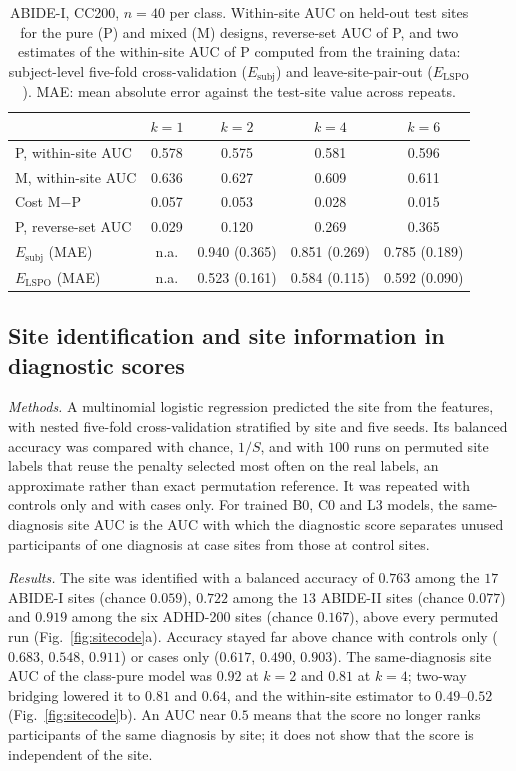 \begin{table}[h]
\centering
\caption{ABIDE-I, CC200, $n=40$ per class. Within-site AUC on held-out test sites for the pure (P) and mixed (M) designs, reverse-set AUC of P, and two estimates of the within-site AUC of P computed from the training data: subject-level five-fold cross-validation ($E_{\mathrm{subj}}$) and leave-site-pair-out ($E_{\mathrm{LSPO}}$). MAE: mean absolute error against the test-site value across repeats.}
\label{tab:kcurve}
\begin{tabular}{lcccc}
\toprule
& $k=1$ & $k=2$ & $k=4$ & $k=6$\\
\midrule
P, within-site AUC & 0.578 & 0.575 & 0.581 & 0.596\\
M, within-site AUC & 0.636 & 0.627 & 0.609 & 0.611\\
Cost M$-$P & 0.057 & 0.053 & 0.028 & 0.015\\
P, reverse-set AUC & 0.029 & 0.120 & 0.269 & 0.365\\
\midrule
$E_{\mathrm{subj}}$ (MAE) & n.a. & 0.940 (0.365) & 0.851 (0.269) & 0.785 (0.189)\\
$E_{\mathrm{LSPO}}$ (MAE) & n.a. & 0.523 (0.161) & 0.584 (0.115) & 0.592 (0.090)\\
\bottomrule
\end{tabular}
\end{table}

\subsection{Site identification and site information in diagnostic scores}

\emph{Methods.} A multinomial logistic regression predicted the site from the features, with nested five-fold cross-validation stratified by site and five seeds. Its balanced accuracy was compared with chance, $1/S$, and with $100$ runs on permuted site labels that reuse the penalty selected most often on the real labels, an approximate rather than exact permutation reference. It was repeated with controls only and with cases only. For trained B0, C0 and L3 models, the same-diagnosis site AUC is the AUC with which the diagnostic score separates unused participants of one diagnosis at case sites from those at control sites.

\emph{Results.} The site was identified with a balanced accuracy of $0.763$ among the $17$ ABIDE-I sites (chance $0.059$), $0.722$ among the $13$ ABIDE-II sites (chance $0.077$) and $0.919$ among the six ADHD-200 sites (chance $0.167$), above every permuted run (Fig.~\ref{fig:sitecode}a). Accuracy stayed far above chance with controls only ($0.683$, $0.548$, $0.911$) or cases only ($0.617$, $0.490$, $0.903$). The same-diagnosis site AUC of the class-pure model was $0.92$ at $k=2$ and $0.81$ at $k=4$; two-way bridging lowered it to $0.81$ and $0.64$, and the within-site estimator to $0.49$--$0.52$ (Fig.~\ref{fig:sitecode}b). An AUC near $0.5$ means that the score no longer ranks participants of the same diagnosis by site; it does not show that the score is independent of the site.

